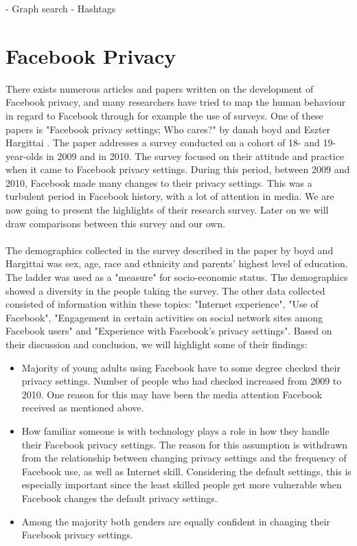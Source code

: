 - Graph search
- Hashtags

\section{Facebook Privacy}
There exists numerous articles and papers written on the development of Facebook privacy, and many researchers have tried to map the human behaviour in regard to Facebook through for example the use of surveys. One of these papers is "Facebook privacy settings; Who cares?" by danah boyd and Eszter Hargittai \cite{whocares}. The paper addresses a survey conducted on a cohort of 18- and 19-year-olds in 2009 and in 2010. The survey focused on their attitude and practice when it came to Facebook privacy settings. During this period, between 2009 and 2010, Facebook made many changes to their privacy settings. This was a turbulent period in Facebook history, with a lot of attention in media. We are now going to present the highlights of their research survey. Later on we will draw comparisons between this survey and our own. 
\paragraph{}
The demographics collected in the survey described in the paper by boyd and Hargittai was sex, age, race and ethnicity and parents' highest level of education. The ladder was used as a "measure" for socio-economic status. The demographics showed a diversity in the people taking the survey. The other data collected consisted of information within these topics: "Internet experience", "Use of Facebook", "Engagement in certain activities on social network sites among Facebook users" and "Experience with Facebook's privacy settings". Based on their discussion and conclusion, we will highlight some of their findings: 

\begin{itemize}
\item Majority of young adults using Facebook have to some degree checked their privacy settings. Number of people who had checked increased from 2009 to 2010. One reason for this may have been the media attention Facebook received as mentioned above. 
\item How familiar someone is with technology plays a role in how they handle their Facebook privacy settings. The reason for this assumption is withdrawn from the relationship between changing privacy settings and the frequency of Facebook use, as well as Internet skill. Considering the default settings, this is especially important since the least skilled people get more vulnerable when Facebook changes the default privacy settings. 
\item Among the majority both genders are equally confident in changing their Facebook privacy settings. 
\end{itemize}

